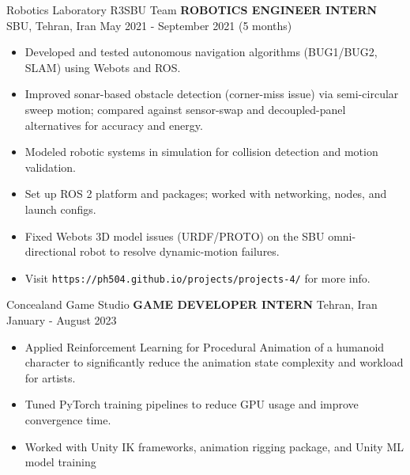 \begin{cventries}
    \cventry
    {Robotics Laboratory \textemdash R3SBU Team}
    {\textbf{ROBOTICS ENGINEER INTERN}}
    {SBU, Tehran, Iran}
    {May 2021 - September 2021 (5 months)}
    {
        \begin{itemize}
            \item Developed and tested autonomous navigation algorithms (BUG1/BUG2, SLAM) using Webots and ROS.
            \item Improved sonar-based obstacle detection (corner-miss issue) via semi-circular sweep motion; compared against sensor-swap and decoupled-panel alternatives for accuracy and energy.
            \item Modeled robotic systems in simulation for collision detection and motion validation.
            \item Set up ROS 2 platform and packages; worked with networking, nodes, and launch configs.
            \item Fixed Webots 3D model issues (URDF/PROTO) on the SBU omni-directional robot to resolve dynamic-motion failures.
            \item Visit \texttt{https://ph504.github.io/projects/projects-4/} for more info.
        \end{itemize}
    }
\end{cventries}
                              
\begin{cventries}
    \cventry
    {Concealand Game Studio}
    {\textbf{GAME DEVELOPER INTERN}}
    {Tehran, Iran}
    {January - August 2023}
    {
        \begin{itemize}    
            \item Applied Reinforcement Learning for Procedural Animation of a humanoid character to significantly reduce the animation state complexity and workload for artists.
            \item Tuned PyTorch training pipelines to reduce GPU usage and improve convergence time.
            \item Worked with Unity IK frameworks, animation rigging package, and Unity ML model training
        \end{itemize}
    }
\end{cventries}

